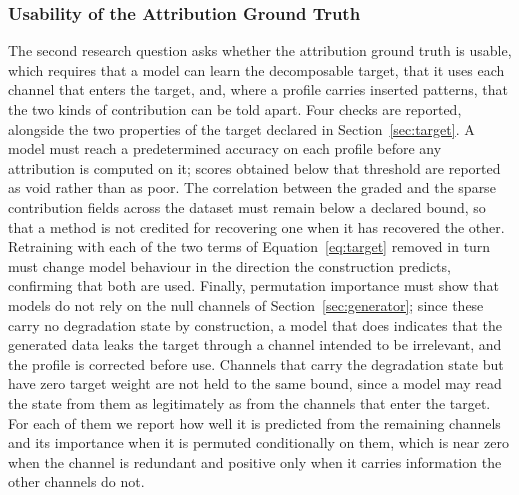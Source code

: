 \documentclass{article}
\newif\ifreview \reviewtrue        %
\newcommand{\rev}[1]{\ifreview\textcolor[HTML]{0B5FA5}{#1}\else#1\fi}
\newcommand{\revwhy}[1]{\ifreview\marginpar{\footnotesize\raggedright\textcolor[HTML]{0B5FA5}{#1}}\fi}
\begin{document}
\subsubsection{Usability of the Attribution Ground Truth}
 
The second research question asks whether the attribution ground truth is usable, which requires that a model can learn the decomposable target\rev{, that it uses each channel that enters the target, and, where a profile carries inserted patterns,} that the two kinds of contribution can be told apart.\revwhy{FIX-4: RQ2 in the v2 scope} Four checks are reported, alongside the two properties of the target declared in Section~\ref{sec:target}. A model must reach a predetermined accuracy on each profile before any attribution is computed on it; scores obtained below that threshold are reported as void rather than as poor. The correlation between the graded and the sparse contribution fields across the dataset must remain below a declared bound, so that a method is not credited for recovering one when it has recovered the other. Retraining with each of the two terms of Equation~\ref{eq:target} removed in turn must change model behaviour in the direction the construction predicts, confirming that both are used. Finally, permutation importance must show that models do not rely on \rev{the null channels of Section~\ref{sec:generator}; since these carry no degradation state by construction,} a model that does indicates that the generated data leaks the target through a channel intended to be irrelevant, and the profile is corrected before use. \rev{Channels that carry the degradation state but have zero target weight are not held to the same bound, since a model may read the state from them as legitimately as from the channels that enter the target. For each of them we report how well it is predicted from the remaining channels and its importance when it is permuted conditionally on them, which is near zero when the channel is redundant and positive only when it carries information the other channels do not.}
 
\end{document}
